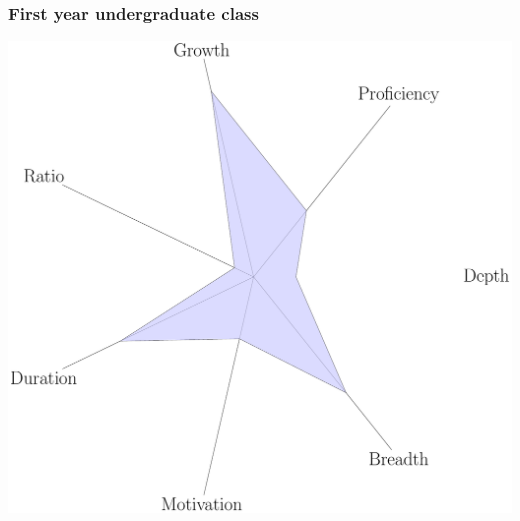 \documentclass{beamer}
\begin{document}
    \begin{frame}
        \frametitle{First year undergraduate class}
        \centering
        \includegraphics[height=.8\textheight]{static/big-class/main.pdf}
    \end{frame}
\end{document}
